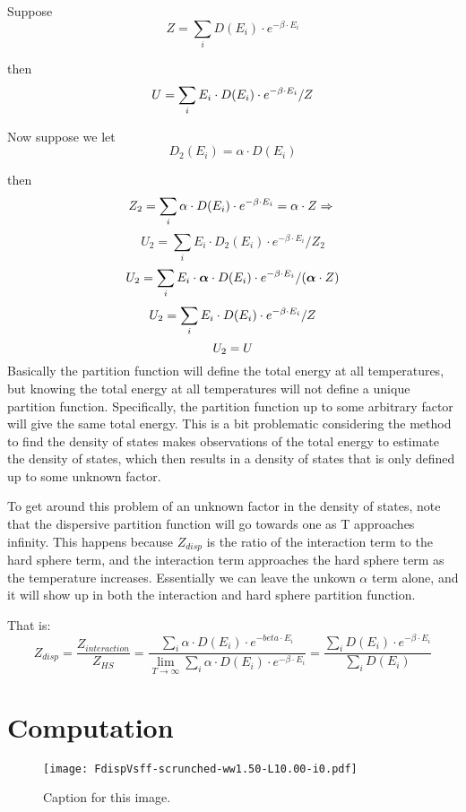 Suppose $$Z=\sum_i D(E_i)\cdot e^{-\beta\cdot E_i}$$

then $$U=\sum_i E_i\cdot D(E_i)\cdot e^{-\beta\cdot E_i}/Z\newline$$

Now suppose we let $$D_2(E_i)=\alpha\cdot D(E_i)$$

then $$Z_2=\sum_i \alpha\cdot D(E_i)\cdot e^{-\beta\cdot E_i}=\alpha\cdot Z\Rightarrow\newline$$
$$U_2=\sum_i E_i\cdot D_2(E_i)\cdot e^{-\beta\cdot E_i}/Z_2$$
$$\newline U_2=\sum_i E_i\cdot \boldsymbol{\alpha}\cdot D(E_i)\cdot e^{-\beta\cdot E_i}/(\boldsymbol{\alpha}\cdot Z)$$
$$\newline U_2=\sum_i E_i\cdot D(E_i)\cdot e^{-\beta\cdot E_i}/Z$$
$$\newline U_2=U\newline$$
Basically the partition function will define the total energy at all temperatures, but knowing the total energy at all temperatures will not define a unique partition function. Specifically, the partition function up to some arbitrary factor will give the same total energy. This is a bit problematic considering the method to find the density of states makes observations of the total energy to estimate the density of states, which then results in a density of states that is only defined up to some unknown factor.

To get around this problem of an unknown factor in the density of states, note that the dispersive partition function will go towards one as T approaches infinity. This happens because $Z_{disp}$ is the ratio of the interaction term to the hard sphere term, and the interaction term approaches the hard sphere term as the temperature increases. Essentially we can leave the unkown $\alpha$ term alone, and it will show up in both the interaction and hard sphere partition function.

That is: $$Z_{disp}=\frac{Z_{interaction}}{Z_{HS}}=\frac{\sum_i \alpha\cdot D(E_i)\cdot e^{-beta\cdot E_i}}{\lim_{T\to\infty}\sum_i \alpha\cdot D(E_i)\cdot e^{-\beta\cdot E_i}}=\frac{\sum_i D(E_i)\cdot e^{-\beta\cdot E_i}}{\sum_i D(E_i)}$$
\newpage
\section{Computation}
\begin{figure}[h]
\vspace*{-7mm}
\hspace*{-6mm}
	\centering
	\texttt{[image: FdispVsff-scrunched-ww1.50-L10.00-i0.pdf]}
	\caption{Caption for this image.}
	\label{fig:FdispVsff}
\end{figure}

